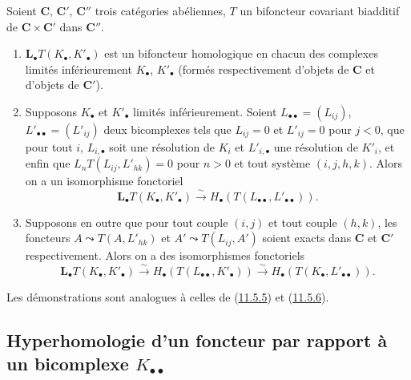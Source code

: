 \begin{proposition}[11.6.5]
\label{0.11.6.5-fr}
Soient $\boldsymbol{C}$, $\boldsymbol{C}'$, $\boldsymbol{C}''$ trois catégories
abéliennes, $T$ un bifoncteur covariant biadditif de
$\boldsymbol{C}\times\boldsymbol{C}'$ dans $\boldsymbol{C}''$.
\begin{enumerate}
\item[{\rm(i)}] {$\mathbf{L}_\bullet T(K_\bullet,K'_\bullet)$ est un bifoncteur
homologique en chacun des complexes limités inférieurement $K_\bullet$,
$K'_\bullet$ (formés respectivement d'objets de $\boldsymbol{C}$ et d'objets de
$\boldsymbol{C}'$).}
\item[{\rm(ii)}] {Supposons $K_\bullet$ et $K'_\bullet$ limités
inférieurement. Soient $L_{\bullet\bullet}=(L_{ij})$,
$L'_{\bullet\bullet}=(L'_{ij})$ deux bicomplexes tels que $L_{ij}=0$ et
$L'_{ij}=0$ pour $j<0$, que pour tout $i$, $L_{i,\bullet}$ soit une
résolution de $K_i$ et $L'_{i,\bullet}$ une résolution de $K'_i$, et enfin que
$L_nT(L_{ij},L'_{hk})=0$ pour $n>0$ et tout système $(i,j,h,k)$. Alors on a
un isomorphisme fonctoriel}
\[
\label{0.11.6.5.1-fr}
\tag{11.6.5.1}
\mathbf{L}_\bullet T(K_\bullet,K'_\bullet)
\xrightarrow{\sim} H_\bullet(T(L_{\bullet\bullet},L'_{\bullet\bullet})).
\]
\item[{\rm(iii)}] {Supposons en outre que pour tout couple $(i,j)$ et
tout couple $(h,k)$, les foncteurs
$A\leadsto T(A,L'_{hk})$ et $A'\leadsto T(L_{ij},A')$
soient exacts dans $\boldsymbol{C}$ et $\boldsymbol{C}'$ respectivement. Alors on a
des isomorphismes fonctoriels}
\[
\label{0.11.6.5.2-fr}
\tag{11.6.5.2}
\mathbf{L}_\bullet T(K_\bullet,K'_\bullet)
\xrightarrow{\sim} H_\bullet(T(L_{\bullet\bullet},K'_\bullet))
\xrightarrow{\sim} H_\bullet(T(K_\bullet,L'_{\bullet\bullet})).
\]
\end{enumerate}
\upshape Les démonstrations sont analogues à celles de
(\hyperref[0.11.5.5-fr]{11.5.5}) et (\hyperref[0.11.5.6-fr]{11.5.6}).
\end{proposition}

\subsection{Hyperhomologie d'un foncteur par rapport à un bicomplexe
$K_{\bullet\bullet}$}
\label{subsection:0.11.7-fr}

